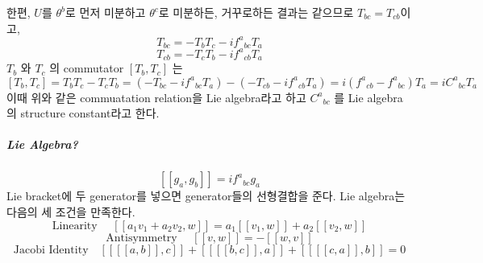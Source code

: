 \documentclass[a4paper,12pt]{report}
\newcommand{\lie}[2][]{[\![#1 #2]\!]}
\begin{document}
	한편, $U$를 $\theta^b$로 먼저 미분하고 $\theta^c$로 미분하든, 거꾸로하든 결과는 같으므로 $T_{bc}=T_{cb}$이고,
	$$T_{bc}=-T_{b}T_{c}-i{f^a}_{bc}T_a$$
	$$T_{cb}=-T_{c}T_{b}-i{f^a}_{cb}T_a$$
	$T_b$ 와 $T_c$ 의 commutator $\left[T_b,T_c\right]$ 는
	$$\left[T_b,T_c\right]=T_bT_c-T_cT_b=(-T_{bc}-i{f^a}_{bc}T_a)-(-T_{cb}-i{f^a}_{cb}T_a)=i({f^a}_{cb}-{f^a}_{bc})T_a=i{C^a}_{bc}T_a$$
	이때 위와 같은 commuatation relation을 Lie algebra라고 하고 ${C^a}_{bc}$ 를 Lie algebra의 structure constant라고 한다. 
	\subparagraph{Lie Algebra?}
	$$\lie{g_a,g_b}=i{f^a}_{bc}g_a$$
	Lie bracket에 두 generator를 넣으면 generator들의 선형결합을 준다. Lie algebra는 다음의 세 조건을 만족한다. 
	$$\mbox{Linearity }\quad\lie{a_1v_1+a_2v_2,w}=a_1\lie{v_1,w}+a_2\lie{v_2,w}$$
	$$\mbox{Antisymmetry }\quad \lie{v,w}=-\lie{w,v}$$
	$$\mbox{Jacobi Identity}\quad \lie{\lie{a,b},c}+\lie{\lie{b,c},a}+\lie{\lie{c,a},b}=0$$
\end{document}
